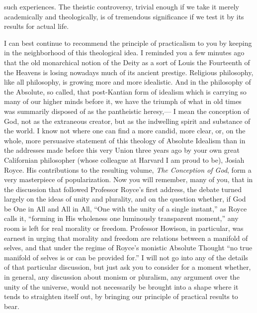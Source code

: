 \documentclass[12pt]{article}
\begin{document}
such experiences. The theistic controversy, trivial enough if we take it merely academically and theologically, is of tremendous significance if we test it by its results for actual life. 

I can best continue to recommend the principle of practicalism to you by keeping in the neighborhood of this theological idea. I reminded you a few minutes ago that the old monarchical notion of the Deity as a sort of Louis the Fourteenth of the Heavens is losing nowadays much of its ancient prestige. Religious philosophy, like all philosophy, is growing more and more idealistic. And in the philosophy of the Absolute, so called, that post-Kantian form of idealism which is carrying so many of our higher minds before it, we have the triumph of what in old times was summarily disposed of as the pantheistic heresy,--- I mean the conception of God, not as the extraneous creator, but as the indwelling spirit and substance of the world. I know not where one can find a more candid, more clear, or, on the whole, more persuasive statement of this theology of Absolute Idealism than in the addresses made before this very Union three years ago by your own great Californian philosopher (whose colleague at Harvard I am proud to be), Josiah Royce. His contributions to the resulting volume, \emph{The Conception of God}, form a very masterpiece of popularization. Now you will remember, many of you, that in the discussion that followed Professor Royce's first address, the debate turned largely on the ideas of unity and plurality, and on the question whether, if God be One in All and All in All, ``One with the unity of a single instant,'' as Royce calls it, ``forming in His wholeness one luminously transparent moment,'' any room is left for real morality or freedom. Professor Howison, in particular, was earnest in urging that morality and freedom are relations between a manifold of selves, and that under the regime of Royce's monistic Absolute Thought ``no true manifold of selves is or can be provided for.'' I will not go into any of the details of that particular discussion, but just ask you to consider for a moment whether, in general, any discussion about monism or pluralism, any argument over the unity of the universe, would not necessarily be brought into a shape where it tends to straighten itself out, by bringing our principle of practical results to bear. 
\end{document}

